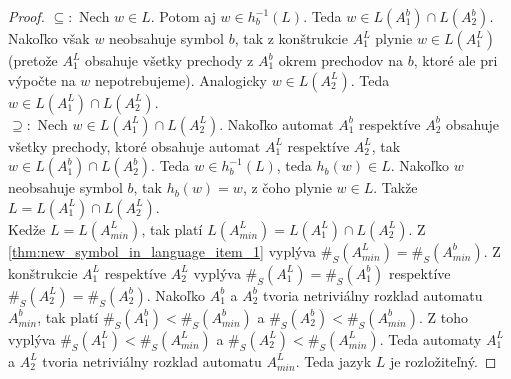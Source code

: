 \begin{proof}
$ \subseteq: $ Nech $ w \in L $. Potom aj $ w \in h_b^{-1}(L) $. Teda $ w \in L(A_1^b) \cap L(A_2^b) $. Nakoľko však $ w $ neobsahuje symbol $ b $, tak z konštrukcie $ A_1^L $ plynie $ w \in L(A_1^L) $ (pretože $ A_1^L $ obsahuje všetky prechody z $ A_1^b $ okrem prechodov na $ b $, ktoré ale pri výpočte na  $ w $ nepotrebujeme). Analogicky $ w \in L(A_2^L) $. Teda $ w \in L(A_1^L) \cap L(A_2^L) $. \\
$ \supseteq: $ Nech $ w \in L(A_1^L) \cap L(A_2^L) $. Nakoľko automat $ A_1^b $ respektíve $ A_2^b $ obsahuje všetky prechody, ktoré obsahuje automat $ A_1^L $ respektíve $ A_2^L $, tak $ w \in L(A_1^b) \cap L(A_2^b) $. Teda $ w \in h_b^{-1}(L) $, teda $ h_b(w) \in L $. Nakoľko $ w $ neobsahuje symbol $ b $, tak $ h_b(w) = w $, z čoho plynie $ w \in L $. Takže  $ L = L(A_1^L) \cap L(A_2^L) $. \\
Kedže $ L = L(A^L_{min}) $, tak platí $ L(A^L_{min}) = L(A_1^L) \cap L(A_2^L) $. Z \ref{thm:new_symbol_in_language_item_1} vyplýva $ \#_S(A^L_{min}) = \#_S(A^b_{min}) $. Z konštrukcie $ A_1^L $ respektíve $ A_2^L $ vyplýva $ \#_S(A_1^L)=\#_S(A_1^b) $ respektíve $ \#_S(A_2^L)=\#_S(A_2^b) $. Nakoľko $ A_1^b $ a $ A_2^b $ tvoria netriviálny rozklad automatu $ A^b_{min} $, tak platí $ \#_S(A_1^b) < \#_S(A^b_{min}) $ a $ \#_S(A_2^b) < \#_S(A^b_{min}) $. Z toho vyplýva $ \#_S(A_1^L) < \#_S(A^L_{min}) $ a $ \#_S(A_2^L) < \#_S(A^L_{min}) $. Teda automaty $  A_1^L $ a $ A_2^L $ tvoria netriviálny rozklad automatu $ A^L_{min} $. Teda jazyk $ L $ je rozložiteľný.
\end{proof}















